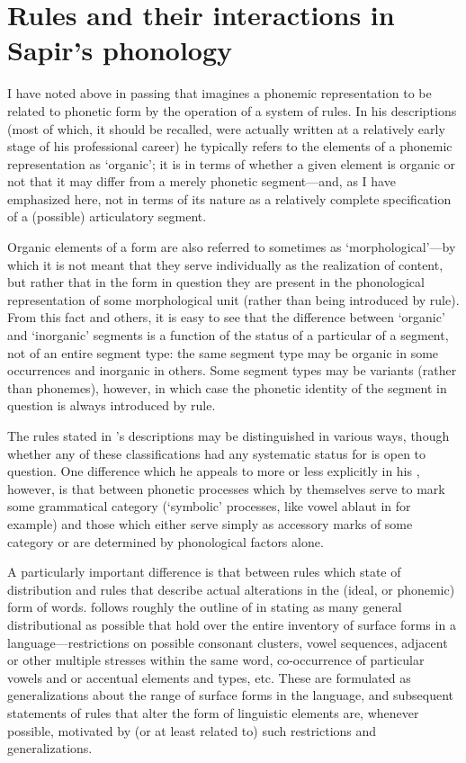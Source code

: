 \section{Rules and their interactions in Sapir's phonology}

I have noted above in passing that {\Sapir} imagines a phonemic
representation to be related to phonetic form by the operation of a
system of rules. In his descriptions (most of which, it should be
recalled, were actually written at a relatively early stage of his
professional career) he typically refers to the elements of a phonemic
representation as `organic'; it is in terms of whether a given element
is organic or not that it may differ from a merely phonetic
segment—and, as I have emphasized here, not in terms of its nature as
a relatively complete specification of a (possible) articulatory
segment.

Organic elements of a form are also referred to sometimes as
`morphological'—by which it is not meant that they serve individually
as the realization of content, but rather that in the form in question
they are present in the phonological representation of some
morphological unit (rather than being introduced by rule). From this
fact and others, it is easy to see that the difference between
`organic' and `inorganic' segments is a function of the status of a
particular  of a segment, not of an entire segment type: the same
segment type may be organic in some occurrences and inorganic in
others. Some segment types may be variants (rather than phonemes),
however, in which case the phonetic identity of the segment in
question is always introduced by rule.

The rules stated in {\Sapir}'s descriptions may be distinguished in
various ways, though whether any of these classifications had any
systematic status for {\Sapir} is open to question. One difference which
he appeals to more or less explicitly in his , however, is
that between phonetic processes which by themselves serve to mark some
grammatical category (`symbolic' processes, like vowel ab\-laut in
 for example) and those which either serve simply as accessory
marks of some category or are determined by phonological factors
alone.

A particularly important difference is that between rules which state
 of distribution and rules that describe actual
alterations in the (ideal, or phonemic) form of words. {\Sapir} follows
roughly the outline of {\Boas} in stating as many general distributional
 as possible that hold over the entire inventory of
surface forms in a language—restrictions on possible consonant
clusters, vowel sequences, adjacent or other multiple stresses within
the same word, co-occurrence of particular vowels and  or
accentual elements and  types, etc. These are formulated as
generalizations about the range of surface forms in the language, and
subsequent statements of rules that alter the form of linguistic
elements are, whenever possible, motivated by (or at least related to)
such restrictions and generalizations.

